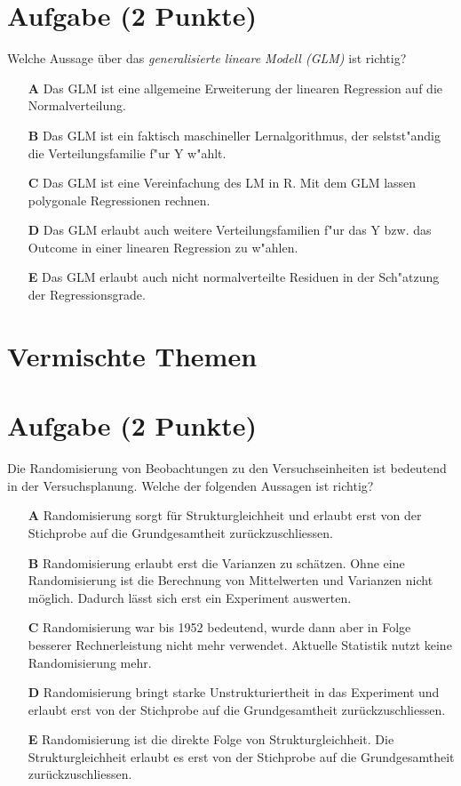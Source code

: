 \documentclass[a4paper, 9pt]{scrartcl}\usepackage[]{graphicx}\usepackage[]{xcolor}
\begin{document}
\section{Aufgabe \hfill (2 Punkte)}

Welche Aussage {\"u}ber das \textit{generalisierte lineare Modell (GLM)} ist richtig?  



\begin{enumerate}
\item [\textbf{A} \msquare] Das GLM ist eine allgemeine Erweiterung der linearen Regression auf die Normalverteilung.
\item [\textbf{B} \msquare] Das GLM ist ein faktisch maschineller Lernalgorithmus, der selstst{"a}ndig die Verteilungsfamilie f{"u}r Y w{"a}hlt.
\item [\textbf{C} \msquare] Das GLM ist eine Vereinfachung des LM in R. Mit dem GLM lassen polygonale Regressionen rechnen.
\item [\textbf{D} \msquare] Das GLM erlaubt auch weitere Verteilungsfamilien f{"u}r das Y bzw. das Outcome in einer linearen Regression zu w{"a}hlen.
\item [\textbf{E} \msquare] Das GLM erlaubt auch nicht normalverteilte Residuen in der Sch{"a}tzung der Regressionsgrade.
\end{enumerate}
\section*{Vermischte Themen}  

\section{Aufgabe \hfill (2 Punkte)}

Die Randomisierung von Beobachtungen zu den Versuchseinheiten
ist bedeutend in der Versuchsplanung. Welche der folgenden Aussagen ist richtig?



\begin{enumerate}
\item [\textbf{A} \msquare] Randomisierung sorgt für Strukturgleichheit und erlaubt erst von der Stichprobe auf die Grundgesamtheit zurückzuschliessen.
\item [\textbf{B} \msquare] Randomisierung erlaubt erst die Varianzen zu schätzen. Ohne eine Randomisierung ist die Berechnung von Mittelwerten und Varianzen nicht möglich. Dadurch lässt sich erst ein Experiment auswerten.
\item [\textbf{C} \msquare] Randomisierung war bis 1952 bedeutend, wurde dann aber in Folge besserer Rechnerleistung nicht mehr verwendet. Aktuelle Statistik nutzt keine Randomisierung mehr.
\item [\textbf{D} \msquare] Randomisierung bringt starke Unstrukturiertheit in das Experiment und erlaubt erst von der Stichprobe auf die Grundgesamtheit zurückzuschliessen.
\item [\textbf{E} \msquare] Randomisierung ist die direkte Folge von Strukturgleichheit. Die Strukturgleichheit erlaubt es erst von der Stichprobe auf die Grundgesamtheit zurückzuschliessen.
\end{enumerate}
\end{document}
